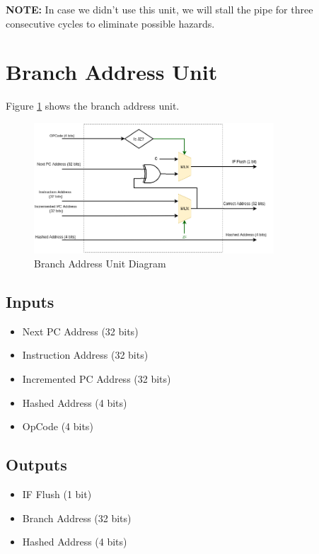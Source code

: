 \documentclass[12pt]{report}
\begin{document}
\textbf{NOTE:} In case we didn't use this unit, we will stall the pipe for three consecutive cycles to eliminate possible hazards.

\section{Branch Address Unit}
Figure \ref{fig:bau} shows the branch address unit.
\begin{center}
    \begin{figure}[hp]
        \centering
        \includegraphics[width=0.8\textwidth]{images/bau}
        \caption{Branch Address Unit Diagram}
        \label{fig:bau}
    \end{figure}
\end{center}

\subsection{Inputs}
\begin{itemize}
    \item Next PC Address (32 bits)
    \item Instruction Address (32 bits)
    \item Incremented PC Address (32 bits)
    \item Hashed Address (4 bits)
    \item OpCode (4 bits)
\end{itemize}

\subsection{Outputs}
\begin{itemize}
    \item IF Flush (1 bit)
    \item Branch Address (32 bits)
    \item Hashed Address (4 bits)
\end{itemize}
\end{document}
